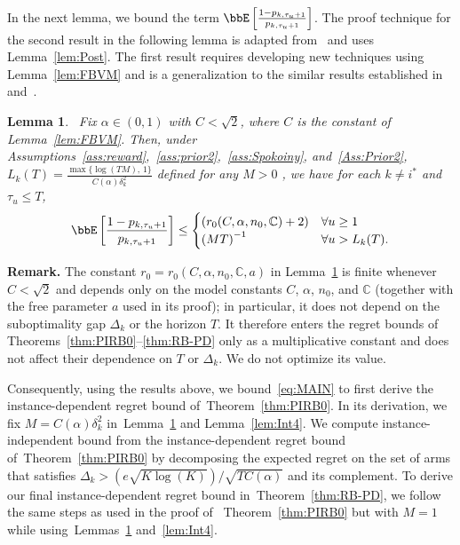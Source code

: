 \documentclass[11pt]{article}
\newtheorem{lemma}[theorem]{Lemma}
\begin{document}
 

    In the next lemma, we bound the term $\bbE \left[   \frac{1-p_{k,\tau_{u}+1}}{p_{k,\tau_{u}+1}}     \right]$. The proof technique for the second result in the following lemma is adapted from~\cite[Lemma 2.13]{agrawal2013further} and uses Lemma~\ref{lem:Post}. The first result requires developing new techniques using Lemma~\ref{lem:FBVM} and is a generalization to the similar results established in~\cite[Lemma 2.13]{agrawal2013further} and~\cite[Lemma 15]{mazumdar20a}.  
        
    \begin{lemma}~\label{lem:Int2}
        Fix $\alpha\in(0,1)$ with $C <  \sqrt{2}$, where $C$ is the constant of Lemma~\ref{lem:FBVM}.  Then, under Assumptions~\ref{ass:reward},~\ref{ass:prior2},~\ref{ass:Spokoiny}, and~\ref{Ass:Prior2}, $L_k(T)= \frac{\max\{\log(TM),\,1\}}{C(\alpha)\delta_k^2}$ defined for any $M>0$ ,  we have for each $k\neq i^*$ and $\tau_{u}\leq T$, 
            \begin{align}
                \bbE \left[   \frac{1-p_{k,\tau_{u}+1}}{p_{k,\tau_{u}+1}}     \right] \leq \begin{cases}
                    (r_0(C,\alpha,n_0,\mathbb{C})+2) & \forall  u \geq 1 %
                    \\
                    \left(MT \right)^{-1}
                    & \forall u > L_k(T).
                \end{cases}
            \end{align}
        \end{lemma}
       
\noindent\textbf{Remark.} The constant $r_0 = r_0(C,\alpha,n_0,\mathbb{C},a)$ in Lemma~\ref{lem:Int2} is finite whenever $C <  \sqrt{2}$ and depends only on the model constants $C$, $\alpha$, $n_0$, and $\mathbb{C}$ (together with the free parameter $a$ used in its proof); in particular, it does not depend on the suboptimality gap $\Delta_k$ or the horizon $T$. It therefore enters the regret bounds of Theorems~\ref{thm:PIRB0}--\ref{thm:RB-PD} only as a multiplicative constant and does not affect their dependence on $T$ or $\Delta_k$. We do not optimize its value.

        Consequently, using the results above, we bound~\eqref{eq:MAIN} to first derive the instance-dependent regret bound of~Theorem~\ref{thm:PIRB0}.  In its derivation, we fix $M=C(\alpha)\delta_k^2$ in~Lemma~\ref{lem:Int2} and Lemma~\ref{lem:Int4}. We compute instance-independent bound from the instance-dependent regret bound of~Theorem~\ref{thm:PIRB0} by decomposing the expected regret on the set of arms that satisfies $\Delta_k > (e\sqrt{K\log(K)})/\sqrt{TC(\alpha)}$ and its complement. To  derive our final 
        instance-dependent regret bound in~Theorem~\ref{thm:RB-PD}, we follow the same steps as used in the proof of ~Theorem~\ref{thm:PIRB0} but with $M=1$ while using~Lemmas~\ref{lem:Int2} and~\ref{lem:Int4}.
\end{document}
